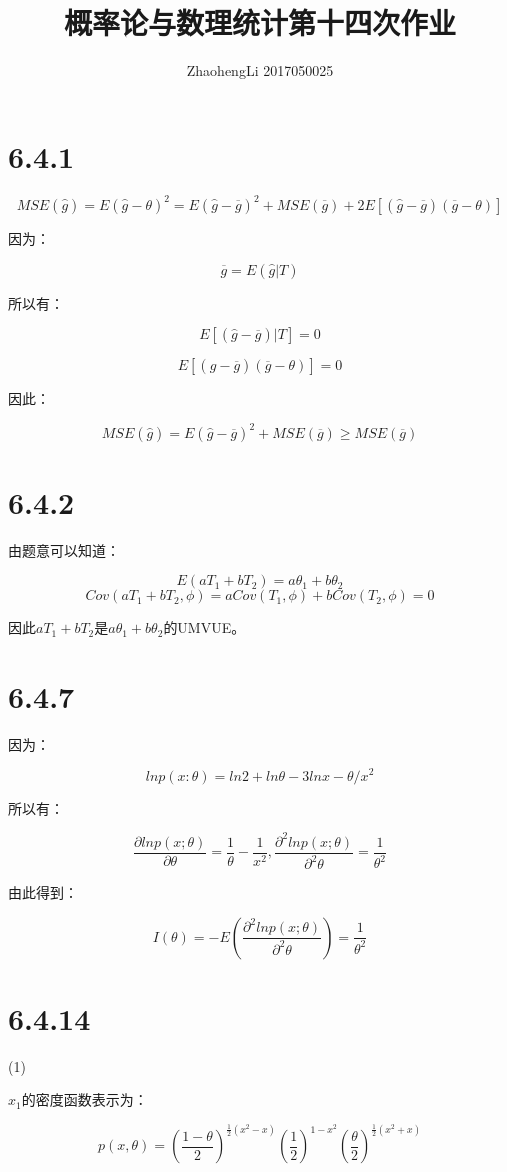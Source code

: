\documentclass{article}
\title{概率论与数理统计第十四次作业}
\author{ZhaohengLi 2017050025}
\begin{document}
\maketitle

\section{6.4.1}

$$MSE(\hat g)=E(\hat g-\theta)^2=E(\hat g - \overline g)^2+MSE(\overline g)+2E[(\hat g-\overline g)(\overline g-\theta)]$$

因为：

$$\overline g = E(\hat g | T)$$

所以有：

$$E[(\hat g- \overline g)|T]=0$$

$$E[(\hat g-\overline g)(\overline g-\theta)]=0$$

因此：

$$MSE(\hat g)=E(\hat g - \overline g)^2+MSE(\overline g)\geq MSE(\overline g)$$

\section{6.4.2}
由题意可以知道：

$$E(aT_1+bT_2)=a\theta_1+b\theta_2$$
$$Cov(aT_1+bT_2,\phi)=aCov(T_1,\phi)+bCov(T_2,\phi)=0$$

因此$aT_1+bT_2$是$a\theta_1+b\theta_2$的UMVUE。
\section{6.4.7}

因为：

$$lnp(x:\theta)=ln2+ln\theta-3lnx-\theta/x^2$$

所以有：

$$\frac{\partial lnp(x;\theta)}{\partial\theta}=\frac1\theta-\frac1{x^2},\frac{\partial^2 lnp(x;\theta)}{\partial^2\theta}=\frac1{\theta^2}$$

由此得到：

$$I(\theta)=-E(\frac{\partial^2 lnp(x;\theta)}{\partial^2\theta})=\frac1{\theta^2}$$

\section{6.4.14}
(1)

$x_1$的密度函数表示为：

$$p(x,\theta)=(\frac{1-\theta}{2})^{\frac12(x^2-x)}(\frac12)^{1-x^2}(\frac\theta2)^{\frac12(x^2+x)}$$
\end{document}
